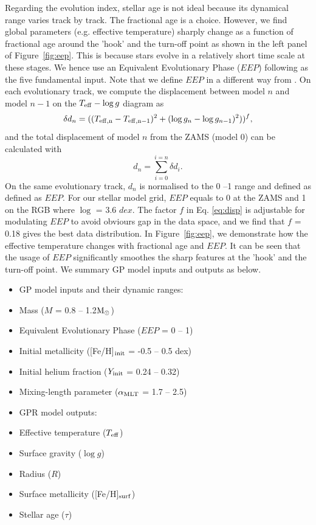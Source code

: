 Regarding the evolution index, stellar age is not ideal because its dynamical range varies track by track. The fractional age is a choice. However, we find global parameters (e.g. effective temperature) sharply change as a function of fractional age around the 'hook' and the turn-off point as shown in the left panel of Figure~\ref{fig:eep}. This is because stars evolve in a relatively short time scale at these stages. We hence use an Equivalent Evolutionary Phase ($EEP$) following \citet{2016ApJS..222....8D} as the five fundamental input. Note that we define $EEP$ in a  different way from \citet{2016ApJS..222....8D}. 
%
On each evolutionary track, we compute the displacement between model $n$ and model $n-1$ on the $T_{\rm eff} - \log g$ diagram as
\begin{equation}\label{eq:disp}
\delta d_{n} = ((T_{\rm eff, n} - T_{\rm eff, n-1}) ^{2} + (\log g _{n} - \log g_{n-1})^{2}))^{f},
\end{equation}
and the total displacement of model $n$ from the ZAMS (model 0) can be calculated with
\begin{equation}
d_{n} = \sum_{i = 0}^{i = n} \delta d_{i} .
\end{equation}
On the same evolutionary track, $d_{n}$ is normalised to the 0 --1 range and defined as defined as $EEP$. For our stellar model grid, $EEP$ equals to 0 at the ZAMS and 1 on the RGB where $\log$ = 3.6 $dex$. The factor $f$ in Eq. \ref{eq:disp} is adjustable for modulating $EEP$ to avoid obviours gap in the data space, and we find that $f$ = 0.18 gives the best data distribution.
%
In Figure~\ref{fig:eep}, we demonstrate how the effective temperature changes with fractional age and $EEP$. It can be seen that the usage of $EEP$ significantly smoothes the sharp features at the 'hook' and the turn-off point.
We summary GP model inputs and outputs as below.
\begin{itemize}
\item GP model inputs and their dynamic ranges:
\item[] Mass ($M$ = 0.8 -- 1.2$\rm M_{\odot}$)
\item[] Equivalent Evolutionary Phase ($EEP$ = 0 -- 1)
\item[] Initial metallicity ([Fe/H]$_{\rm init}$ =  -0.5 -- 0.5 dex)
\item[] Initial helium fraction ($Y_{\rm init}$ = 0.24 -- 0.32)
\item[] Mixing-length parameter ($\alpha_{\rm MLT}$ = 1.7 -- 2.5)
\item GPR model outputs: 
\item[] Effective temperature ($T_{\rm eff}$) 
\item[] Surface gravity ($\log g$)
\item[] Radius ($R$)
\item[] Surface metallicity ([Fe/H]$_{\rm surf}$)
\item[] Stellar age ($\tau$)
\end{itemize}
